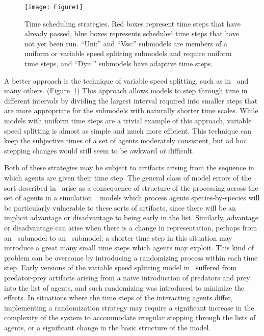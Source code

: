 \begin{figure}\label{times}
\begin{center}
  \texttt{[image: Figure1]}
  \caption{Time scheduling strategies.  Red boxes represent time steps that
    have already passed, blue boxes represents scheduled time steps
    that have not yet been run. ``Uni:''  and ``Vss:'' sub\-models are
    members of a uniform or variable speed splitting
    sub\-models and require uniform time steps, and ``Dyn:'' sub\-models
    have adaptive time steps.}
\end{center}
\end{figure}
A better approach is the technique of variable speed splitting, such
as in~\cite{walters2004fisheries} and many others. (Figure~\ref{times}) This approach allows models to step through time in
different intervals by dividing the largest interval required into
smaller steps that are more appropriate for the sub\-models with
naturally shorter time scales. While models with uniform time steps are
a trivial example of this approach, variable speed splitting is almost
as simple and much more efficient.  This technique can keep the
subjective times of a set of agents moderately consistent, but ad hoc
stepping changes would still seem to be awkward or difficult.

Both of these strategies may be subject to artifacts arising from the
sequence in which agents are given their time step.  The general class
of model errors of the sort described in~\cite{chivers2009generalised}
arise as a consequence of structure of the processing across the set
of agents in a simulation. \IB\ models which process agents
species-by-species will be particularly vulnerable to these sorts of
artifacts, since there will be an implicit advantage or disadvantage
to being early in the list.  Similarly, advantage or disadvantage can
arise when there is a change in rep\-re\-sen\-ta\-tion, perhaps from an
\SD\ sub\-model to an \IB\ sub\-model; a shorter time step in this
situation may introduce a great many small time steps which agents may
exploit.  This kind of problem can be overcome by introducing a
randomizing process within each time step. Early versions of the
variable speed splitting model in~\cite{lyne1994pmez5} suffered from
predator-prey artifacts arising from a na\"{\i}ve introduction of
predators and prey into the list of agents, and such randomizing was
introduced to minimize the effects. In situations where the time steps
of the interacting agents differ, implementing a randomization
strategy may require a significant increase in the complexity of the
system to accommodate irregular stepping through the lists of
agents, or a significant change in the basic structure of the model.

